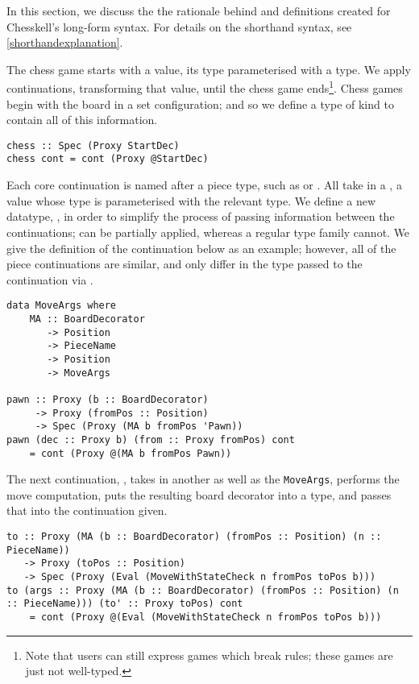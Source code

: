 In this section, we discuss the the rationale behind and definitions created for Chesskell's long-form syntax. For details on the shorthand syntax, see \cref{shorthandexplanation}.

The chess game starts with a  value, its type parameterised with a  type. We apply continuations, transforming that value, until the chess game ends\footnote{Note that users can still express games which break rules; these games are just not well-typed.}. Chess games begin with the board in a set configuration; and so we define a type  of kind  to contain all of this information.

\begin{lstlisting}
chess :: Spec (Proxy StartDec)
chess cont = cont (Proxy @StartDec)
\end{lstlisting}

Each core continuation is named after a piece type, such as  or . All take in a , a  value whose type is parameterised with the relevant  type. We define a new datatype, , in order to simplify the process of passing information between the continuations;  can be partially applied, whereas a regular type family cannot. We give the definition of the  continuation below as an example; however, all of the piece continuations are similar, and only differ in the  type passed to the continuation via .

\begin{lstlisting}
data MoveArgs where
    MA :: BoardDecorator
       -> Position
       -> PieceName
       -> Position
       -> MoveArgs

pawn :: Proxy (b :: BoardDecorator)
     -> Proxy (fromPos :: Position)
     -> Spec (Proxy (MA b fromPos 'Pawn))
pawn (dec :: Proxy b) (from :: Proxy fromPos) cont
    = cont (Proxy @(MA b fromPos Pawn))
\end{lstlisting}

The next continuation, , takes in another  as well as the \lstinline{MoveArgs}, performs the move computation, puts the resulting board decorator into a  type, and passes that  into the continuation given.

\begin{lstlisting}
to :: Proxy (MA (b :: BoardDecorator) (fromPos :: Position) (n :: PieceName))
   -> Proxy (toPos :: Position)
   -> Spec (Proxy (Eval (MoveWithStateCheck n fromPos toPos b)))
to (args :: Proxy (MA (b :: BoardDecorator) (fromPos :: Position) (n :: PieceName))) (to' :: Proxy toPos) cont
    = cont (Proxy @(Eval (MoveWithStateCheck n fromPos toPos b)))
\end{lstlisting}

